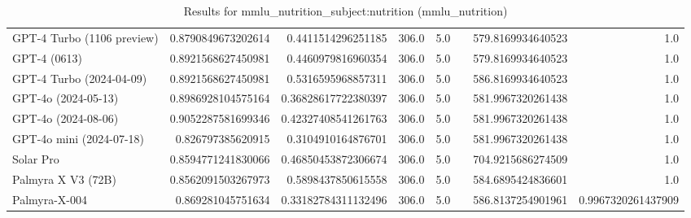 \begin{table}[htp]
{\begin{tabular}{lrrrrrrr}
GPT-4 Turbo (1106 preview) & 0.8790849673202614 & 0.4411514296251185 & 306.0 & 5.0 &  & 579.8169934640523 & 1.0 \\
GPT-4 (0613) & 0.8921568627450981 & 0.4460979816960354 & 306.0 & 5.0 &  & 579.8169934640523 & 1.0 \\
GPT-4 Turbo (2024-04-09) & 0.8921568627450981 & 0.5316595968857311 & 306.0 & 5.0 &  & 586.8169934640523 & 1.0 \\
GPT-4o (2024-05-13) & 0.8986928104575164 & 0.36828617722380397 & 306.0 & 5.0 &  & 581.9967320261438 & 1.0 \\
GPT-4o (2024-08-06) & 0.9052287581699346 & 0.42327408541261763 & 306.0 & 5.0 &  & 581.9967320261438 & 1.0 \\
GPT-4o mini (2024-07-18) & 0.826797385620915 & 0.3104910164876701 & 306.0 & 5.0 &  & 581.9967320261438 & 1.0 \\
Solar Pro & 0.8594771241830066 & 0.46850453872306674 & 306.0 & 5.0 &  & 704.9215686274509 & 1.0 \\
Palmyra X V3 (72B) & 0.8562091503267973 & 0.5898437850615558 & 306.0 & 5.0 &  & 584.6895424836601 & 1.0 \\
Palmyra-X-004 & 0.869281045751634 & 0.33182784311132496 & 306.0 & 5.0 &  & 586.8137254901961 & 0.9967320261437909 \\
\bottomrule
\end{tabular}}
\caption{Results for mmlu_nutrition_subject:nutrition (mmlu_nutrition)}
\label{fig:mmlu_nutrition_subject:nutrition (mmlu_nutrition)}
\end{table}